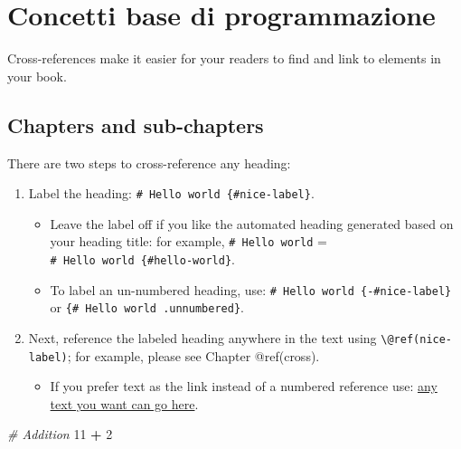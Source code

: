 \documentclass[
]{book}
\newenvironment{Shaded}{\begin{snugshade}}{\end{snugshade}}
\newcommand{\CommentTok}[1]{\textcolor[rgb]{0.56,0.35,0.01}{\textit{#1}}}
\newcommand{\DecValTok}[1]{\textcolor[rgb]{0.00,0.00,0.81}{#1}}
\newcommand{\SpecialCharTok}[1]{\textcolor[rgb]{0.81,0.36,0.00}{\textbf{#1}}}
\providecommand{\tightlist}{%
  \setlength{\itemsep}{0pt}\setlength{\parskip}{0pt}}
\begin{document}
\hypertarget{cross}{%
\chapter{Concetti base di programmazione}\label{cross}}

Cross-references make it easier for your readers to find and link to
elements in your book.

\hypertarget{chapters-and-sub-chapters}{%
\section{Chapters and sub-chapters}\label{chapters-and-sub-chapters}}

There are two steps to cross-reference any heading:

\begin{enumerate}
\def\labelenumi{\arabic{enumi}.}
\tightlist
\item
  Label the heading: \texttt{\#\ Hello\ world\ \{\#nice-label\}}.

  \begin{itemize}
  \tightlist
  \item
    Leave the label off if you like the automated heading generated
    based on your heading title: for example, \texttt{\#\ Hello\ world}
    = \texttt{\#\ Hello\ world\ \{\#hello-world\}}.
  \item
    To label an un-numbered heading, use:
    \texttt{\#\ Hello\ world\ \{-\#nice-label\}} or
    \texttt{\{\#\ Hello\ world\ .unnumbered\}}.
  \end{itemize}
\item
  Next, reference the labeled heading anywhere in the text using
  \texttt{\textbackslash{}@ref(nice-label)}; for example, please see
  Chapter @ref(cross).

  \begin{itemize}
  \tightlist
  \item
    If you prefer text as the link instead of a numbered reference use:
    \protect\hyperlink{cross}{any text you want can go here}.
  \end{itemize}
\end{enumerate}

\begin{Shaded}
\begin{Highlighting}[]
\CommentTok{\# Addition}
\DecValTok{11} \SpecialCharTok{+} \DecValTok{2}
\end{Highlighting}
\end{Shaded}
\end{document}
